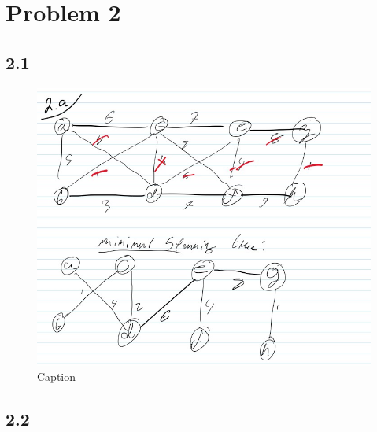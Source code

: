 \documentclass{article}
\begin{document}
\section*{Problem 2}


\subsection*{2.1}
\begin{figure}[h!]
    \centering
    \includegraphics[width=0.5\linewidth]{figures/problemset4_fig_2.jpg}
    \caption{Caption}
    \label{fig:enter-label}
\end{figure}




\subsection*{2.2}
\end{document}
